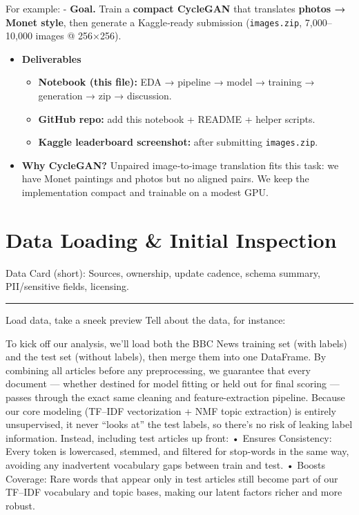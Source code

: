 \documentclass[
  letterpaper,
  DIV=11,
  numbers=noendperiod]{scrartcl}
\providecommand{\tightlist}{%
  \setlength{\itemsep}{0pt}\setlength{\parskip}{0pt}}
\begin{document}
For example: - \textbf{Goal.} Train a \textbf{compact CycleGAN} that
translates \textbf{photos → Monet style}, then generate a Kaggle‑ready
submission (\texttt{images.zip}, 7,000--10,000 images @ 256×256).

\begin{itemize}
\tightlist
\item
  \textbf{Deliverables}

  \begin{itemize}
  \tightlist
  \item
    \textbf{Notebook (this file):} EDA → pipeline → model → training →
    generation → zip → discussion.
  \item
    \textbf{GitHub repo:} add this notebook + README + helper scripts.
  \item
    \textbf{Kaggle leaderboard screenshot:} after submitting
    \texttt{images.zip}.
  \end{itemize}
\item
  \textbf{Why CycleGAN?} Unpaired image‑to‑image translation fits this
  task: we have Monet paintings and photos but no aligned pairs. We keep
  the implementation compact and trainable on a modest GPU.
\end{itemize}

\section{Data Loading \& Initial
Inspection}\label{data-loading-initial-inspection}

Data Card (short): Sources, ownership, update cadence, schema summary,
PII/sensitive fields, licensing.

\begin{center}\rule{0.5\linewidth}{0.5pt}\end{center}

Load data, take a sneek preview Tell about the data, for instance:

To kick off our analysis, we'll load both the BBC News training set
(with labels) and the test set (without labels), then merge them into
one DataFrame. By combining all articles before any preprocessing, we
guarantee that every document --- whether destined for model fitting or
held out for final scoring --- passes through the exact same cleaning
and feature-extraction pipeline. Because our core modeling (TF--IDF
vectorization + NMF topic extraction) is entirely unsupervised, it never
``looks at'' the test labels, so there's no risk of leaking label
information. Instead, including test articles up front: • Ensures
Consistency: Every token is lowercased, stemmed, and filtered for
stop-words in the same way, avoiding any inadvertent vocabulary gaps
between train and test. • Boosts Coverage: Rare words that appear only
in test articles still become part of our TF--IDF vocabulary and topic
bases, making our latent factors richer and more robust.
\end{document}

